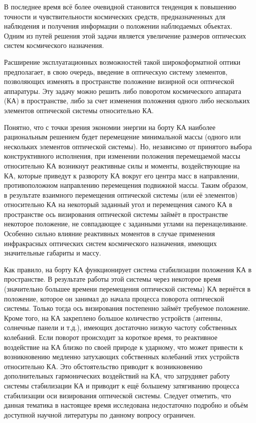 
{\actuality} В последнее время всё более очевидной становится тенденция к повышению точности и чувствительности космических средств, предназначенных для наблюдения и получения информации о положении наблюдаемых объектах. Одним из путей решения этой задачи является увеличение размеров оптических систем космического назначения.

Расширение эксплуатационных возможностей такой широкоформатной оптики предполагает, в свою очередь, введение в оптическую систему элементов, позволяющих изменять в пространстве положение визирной оси оптической аппаратуры. Эту задачу можно решить либо поворотом космического аппарата (КА) в пространстве, либо за счет изменения положения одного либо нескольких элементов оптической системы относительно КА. 


Понятно, что с точки зрения экономии энергии на борту КА наиболее рациональным решением будет перемещение минимальной массы (одного или нескольких элементов оптической системы). Но, независимо от принятого выбора конструктивного исполнения, при изменении положения перемещаемой массы относительно КА возникнут реактивные силы и моменты, воздействующие на КА, которые приведут к развороту КА вокруг его центра масс в направлении, противоположном направлению перемещения подвижной массы. Таким образом, в результате взаимного перемещения оптической системы (или её элементов) относительно КА на некоторый заданный угол и перемещения самого КА в пространстве ось визирования оптической системы займёт в пространстве некоторое положение, не совпадающее с заданными углами на перенацеливание.  Особенно сильно влияние реактивных моментов в случае применения инфракрасных оптических систем космического назначения, имеющих значительные габариты и массу. 

Как правило, на борту КА функционирует система стабилизации положения КА в пространстве. В результате работы этой системы через некоторое время (значительно большее времени перемещения оптической системы) КА вернётся в положение, которое он занимал до начала процесса поворота оптической системы. Только тогда ось визирования постепенно займёт требуемое положение. Кроме того, на КА закреплено большое количество устройств (антенны, солнечные панели и т.д.), имеющих достаточно низкую частоту собственных колебаний. Если поворот происходит за короткое время, то реактивное воздействие на КА близко по своей природе к ударному, что может привести к возникновению медленно затухающих собственных колебаний этих устройств относительно КА. Это обстоятельство приводит к возникновению дополнительных гармонических воздействий на КА, что затрудняет работу системы стабилизации КА и приводит к ещё большему затягиванию процесса стабилизации оси визирования оптической системы.
Следует отметить, что данная тематика в настоящее время исследована недостаточно подробно и объём доступной научной литературы по данному вопросу ограничен.

